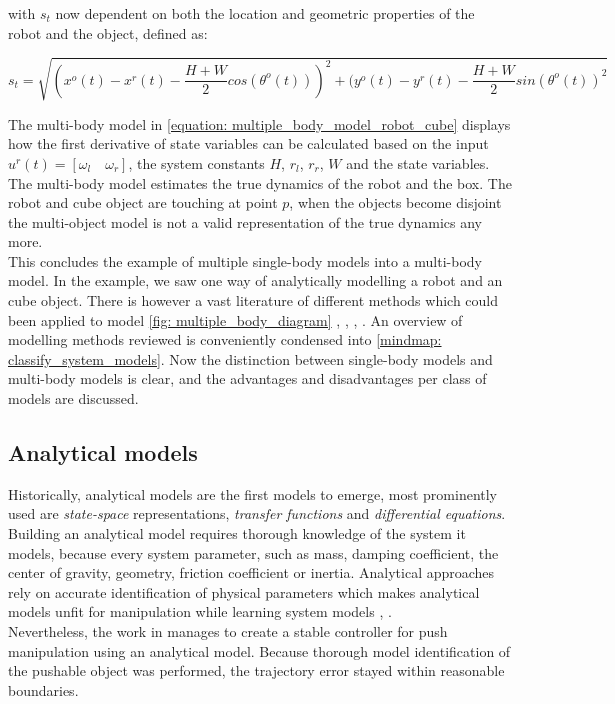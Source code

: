 with $s_t$ now dependent on both the location and geometric properties of the robot and the object, defined as:

$$
s_t = \sqrt{(x^o(t)-x^r(t)-\frac{H+W}{2}cos(\theta^o(t)))^2 + (y^o(t)-y^r(t)-\frac{H+W}{2}sin(\theta^o(t))^2}
$$

The multi-body model in \cref{equation: multiple_body_model_robot_cube} displays how the first derivative of state variables can be calculated based on the input $u^r(t) = \left[\omega_l \quad \omega_r \right]$, the system constants $H$, $r_l$, $r_r$, $W$ and the state variables. The multi-body model estimates the true dynamics of the robot and the box. The robot and cube object are touching at point $p$, when the objects become disjoint the multi-object model is not a valid representation of the true dynamics any more. \\

This concludes the example of multiple single-body models into a multi-body model. In the example, we saw one way of analytically modelling a robot and an cube object. There is however a vast literature of different methods which could been applied to model \cref{fig: multiple_body_diagram} \cite{nascimento_nonholonomic_2018}, \cite{bauza_data-efficient_2018}, \cite{stuber_feature-based_2018}, \cite{stuber_lets_2020}. An overview of modelling methods reviewed is conveniently condensed into \cref{mindmap: classify_system_models}. Now the distinction between single-body models and multi-body models is clear, and the advantages and disadvantages per class of models are discussed.

\subsection{Analytical models}
\label{subsection: analytical_models}
Historically, analytical models are the first models to emerge, most prominently used are \textit{state-space} representations, \textit{transfer functions} and \textit{differential equations}. Building an analytical model requires thorough knowledge of the system it models, because every system parameter, such as mass, damping coefficient, the center of gravity, geometry, friction coefficient or inertia. Analytical approaches rely on accurate identification of physical parameters which makes analytical models unfit for manipulation while learning system models \cite{arruda_uncertainty_2017}, \cite{stuber_feature-based_2018}.\\

Nevertheless, the work in \cite{bauza_data-efficient_2018} manages to create a stable controller for push manipulation using an analytical model. Because thorough model identification of the pushable object was performed, the trajectory error stayed within reasonable boundaries. 

